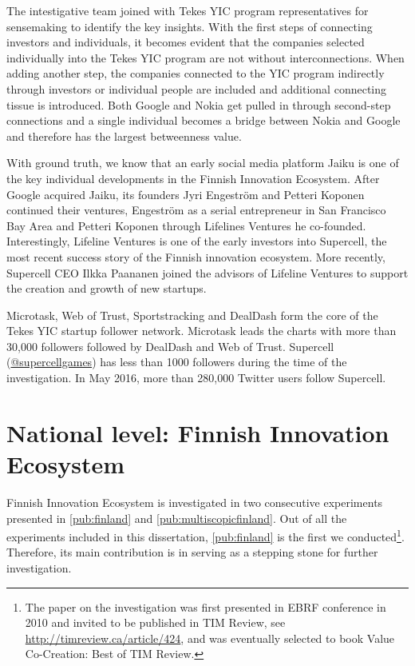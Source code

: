The intestigative team joined with Tekes YIC program representatives for sensemaking to identify the key insights. With the first steps of connecting investors and individuals, it becomes evident that the companies selected individually into the Tekes YIC program are not without interconnections. When adding another step, the companies connected to the YIC program indirectly through investors or individual people are included and additional connecting tissue is introduced. Both Google and Nokia get pulled in through second-step connections and a single individual becomes a bridge between Nokia and Google and therefore has the largest betweenness value.

With ground truth, we know that an early social media platform Jaiku is one of the key individual developments in the Finnish Innovation Ecosystem. After Google acquired Jaiku, its founders Jyri Engeström and Petteri Koponen continued their ventures, Engeström as a serial entrepreneur in San Francisco Bay Area and Petteri Koponen through  Lifelines Ventures he co-founded. Interestingly, Lifeline Ventures is one of the early investors into Supercell, the most recent success story of the Finnish innovation ecosystem. More recently, Supercell CEO Ilkka Paananen joined the advisors of Lifeline Ventures to support the creation and growth of new startups.

Microtask, Web of Trust, Sportstracking and DealDash form the core of the Tekes YIC startup follower network. Microtask leads the charts with more than 30,000 followers followed by DealDash and Web of Trust. Supercell (\href{https://twitter.com/supercellgames}{@supercellgames}) has less than 1000 followers during the time of the investigation. In May 2016, more than 280,000 Twitter users follow Supercell.

\section{National level: Finnish Innovation Ecosystem}

Finnish Innovation Ecosystem is investigated in two consecutive experiments presented in \ref{pub:finland} and \ref{pub:multiscopicfinland}. Out of all the experiments included in this dissertation, \ref{pub:finland} is the first we \citep{Huhtamaki2013AFinancing} conducted\footnote{The paper on the investigation was first presented in EBRF conference in 2010 and invited to be published in TIM Review, see \url{http://timreview.ca/article/424}, and was eventually selected to book Value Co-Creation: Best of TIM Review.}. Therefore, its main contribution is in serving as a stepping stone for further investigation. 

